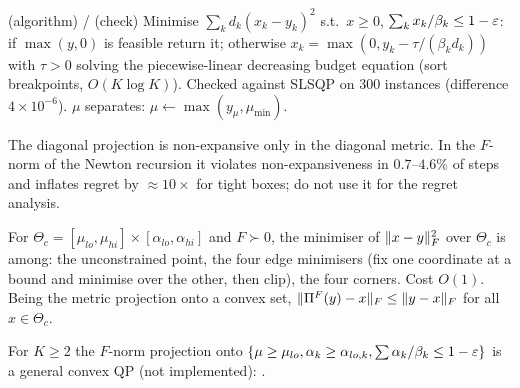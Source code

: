\begin{proposition}\label{prop:projdiag}\Pt{} (algorithm) / \Nt{} (check)
Minimise $\sum_kd_k(x_k-y_k)^2$ s.t.\ $x\ge0$, $\sum_kx_k/\beta_k\le1-\varepsilon$: if $\max(y,0)$ is feasible return it; otherwise $x_k=\max(0,y_k-\tau/(\beta_kd_k))$ with $\tau>0$ solving the piecewise-linear decreasing budget equation (sort breakpoints, $O(K\log K)$). Checked against SLSQP on $300$ instances (difference $4\times10^{-6}$). $\mu$ separates: $\mu\leftarrow\max(y_\mu,\mu_{\min})$.
\end{proposition}
The diagonal projection is non-expansive only in the diagonal metric. In the $F$-norm of the Newton recursion it violates non-expansiveness in $0.7$--$4.6\%$ of steps and inflates regret by $\approx10\times$ for tight boxes; do not use it for the regret analysis.

\begin{proposition}[exact $F$-norm projection onto a box, $K=1$]\label{prop:projbox}\Pt{}
For $\Theta_c=[\mu_{lo},\mu_{hi}]\times[\alpha_{lo},\alpha_{hi}]$ and $F\succ0$, the minimiser of $\lVert x-y\rVert_F^2$ over $\Theta_c$ is among: the unconstrained point, the four edge minimisers (fix one coordinate at a bound and minimise over the other, then clip), the four corners. Cost $O(1)$. Being the metric projection onto a convex set, $\lVert \Pi^F(y)-x\rVert_F\le\lVert y-x\rVert_F$ for all $x\in\Theta_c$.
\end{proposition}
For $K\ge2$ the $F$-norm projection onto $\{\mu\ge\mu_{lo},\alpha_k\ge\alpha_{lo,k},\sum\alpha_k/\beta_k\le1-\varepsilon\}$ is a general convex QP (not implemented): \Ot{}.
